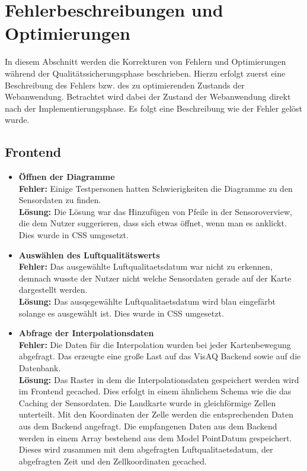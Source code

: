 \section{Fehlerbeschreibungen und Optimierungen}
In diesem Abschnitt werden die Korrekturen von Fehlern und Optimierungen während der Qualitätssicherungsphase beschrieben. Hierzu erfolgt zuerst eine Beschreibung des Fehlers bzw. des zu optimierenden Zustands der Webanwendung. Betrachtet wird dabei der Zustand der Webanwendung direkt nach der Implementierungsphase. Es folgt eine Beschreibung wie der Fehler gelöst wurde.

\subsection{Frontend}
\begin{itemize}
	\item \textbf{Öffnen der Diagramme}
	\\
	\textbf{Fehler:} Einige Testpersonen hatten Schwierigkeiten die Diagramme zu den Sensordaten zu finden.
	\\
	\textbf{Lösung:} Die Lösung war das Hinzufügen von Pfeile in der \gls{Sensoroverview}, die dem Nutzer suggerieren, dass sich etwas öffnet, wenn man es anklickt. Dies wurde in CSS umgesetzt.
	\item \textbf{Auswählen des Luftqualitätswerts}
	\\
	\textbf{Fehler:} Das ausgewählte \gls{Luftqualitaetsdatum} war nicht zu erkennen, demnach wusste der Nutzer nicht welche Sensordaten gerade auf der Karte dargestellt werden.
	\\
	\textbf{Lösung:} Das ausqegewählte \gls{Luftqualitaetsdatum} wird blau eingefärbt solange es ausgewählt ist. Dies wurde in CSS umgesetzt.
	\item \textbf{Abfrage der Interpolationsdaten}
	\\
	\textbf{Fehler:} Die Daten für die Interpolation wurden bei jeder Kartenbewegung abgefragt. Das erzeugte eine große Last auf das VisAQ Backend sowie auf die Datenbank.
	\\
	\textbf{Lösung:} Das Raster in dem die Interpolationsdaten gespeichert werden wird im Frontend gecached. Dies erfolgt in einem ähnlichem Schema wie die das Caching der Sensordaten. Die Landkarte wurde in gleichförmige Zellen unterteilt. Mit den Koordinaten der Zelle werden die entsprechenden Daten aus dem Backend angefragt. Die empfangenen Daten aus dem Backend werden in einem Array bestehend aus dem Model PointDatum gespeichert. Dieses wird zusammen mit dem abgefragten \gls{Luftqualitaetsdatum}, der abgefragten Zeit und den Zellkoordinaten gecached.

\end{itemize}
